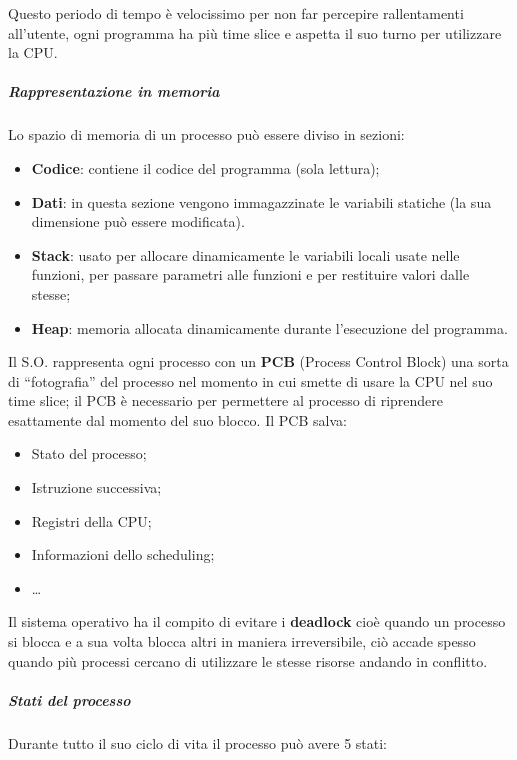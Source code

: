 Questo periodo di tempo è velocissimo per non far percepire
rallentamenti all'utente, ogni programma ha più time slice e aspetta il
suo turno per utilizzare la CPU.

\subparagraph{\texorpdfstring{\emph{Rappresentazione in
memoria}}{Rappresentazione in memoria}}\label{rappresentazione-in-memoria}

Lo spazio di memoria di un processo può essere diviso in sezioni:

\begin{itemize}
\item
  \textbf{Codice}: contiene il codice del programma (sola lettura);
\item
  \textbf{Dati}: in questa sezione vengono immagazzinate le variabili
  statiche (la sua dimensione può essere modificata).
\item
  \textbf{Stack}: usato per allocare dinamicamente le variabili locali
  usate nelle funzioni, per passare parametri alle funzioni e per
  restituire valori dalle stesse;
\item
  \textbf{Heap}: memoria allocata dinamicamente durante l'esecuzione del
  programma.
\end{itemize}

Il S.O. rappresenta ogni processo con un \textbf{PCB} (Process Control
Block) una sorta di ``fotografia'' del processo nel momento in cui
smette di usare la CPU nel suo time slice; il PCB è necessario per
permettere al processo di riprendere esattamente dal momento del suo
blocco. Il PCB salva:

\begin{itemize}
\item
  Stato del processo;
\item
  Istruzione successiva;
\item
  Registri della CPU;
\item
  Informazioni dello scheduling;
\item
  \ldots{}
\end{itemize}

Il sistema operativo ha il compito di evitare i \textbf{deadlock} cioè
quando un processo si blocca e a sua volta blocca altri in maniera
irreversibile, ciò accade spesso quando più processi cercano di
utilizzare le stesse risorse andando in conflitto.

\subparagraph{\texorpdfstring{\emph{Stati del
processo}}{Stati del processo}}\label{stati-del-processo}

Durante tutto il suo ciclo di vita il processo può avere 5 stati:

